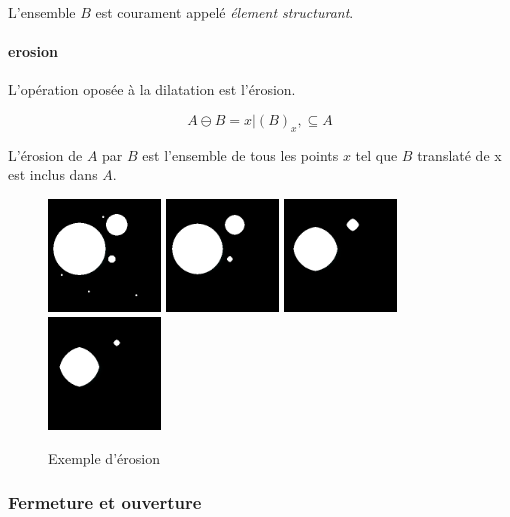 L'ensemble $B$ est courament appelé \emph{élement structurant}.

\paragraph{erosion}

L'opération oposée à la dilatation est l'érosion.

\begin{equation}
  A \ominus B = {x|(B)_x, \subseteq A}
\end{equation}

L'érosion de $A$ par $B$ est l'ensemble de tous les points $x$ tel que $B$ translaté de x est inclus dans $A$. 

\begin{figure}
  \centering
  \includegraphics[height=3cm]{Images/morpho_init.png}
  \includegraphics[height=3cm]{Images/morpho_erode_k5.png}
  \includegraphics[height=3cm]{Images/morpho_erode_k21.png}
  \includegraphics[height=3cm]{Images/morpho_erode_k31.png}
  \label{fig:morpho_erosion}
  \caption{Exemple d'érosion}
\end{figure}

\subsubsection{Fermeture et ouverture}


